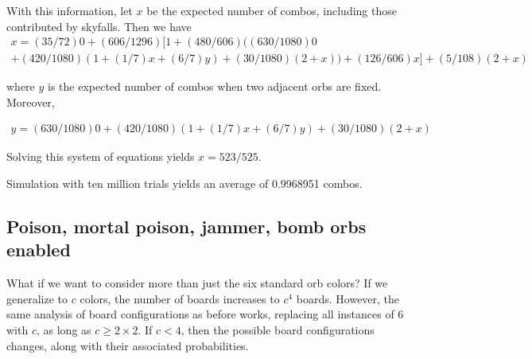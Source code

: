 \documentclass[12pt]{article}
\theoremstyle{definition}
\begin{document}
With this information, let $x$ be the expected number of combos, including those contributed by skyfalls. Then we have
\begin{multline*}
    x = (35/72)0 + (606/1296)[1+(480/606)((630/1080)0 \\
    +(420/1080)(1+(1/7)x+(6/7)y)+(30/1080)(2+x))+(126/606)x] + (5/108)(2+x)
\end{multline*}

where $y$ is the expected number of combos when two adjacent orbs are fixed. Moreover,
\begin{comment}
\begin{multline*}
    y = (630/1080)(0)+(420/1080)[1+(80/101)((1/7)x+(6/7)y)+(21/101)x] \\
    +(30/1080)(2+x)
\end{multline*}
\begin{multline*}
    y = (630/1080)(0)+(420/1080)[1+(60/420)x+(360/420)y] \\
    +(30/1080)(2+x)
\end{multline*}
\end{comment}
\begin{align*}
    y=(630/1080)0
    +(420/1080)(1+(1/7)x+(6/7)y)
    +(30/1080)(2+x)
\end{align*}

Solving this system of equations yields $x = 523/525$.

Simulation with ten million trials yields an average of 0.9968951 combos.

\subsection{Poison, mortal poison, jammer, bomb orbs enabled}
What if we want to consider more than just the six standard orb colors? If we generalize to $c$ colors, the number of boards increases to $c^4$ boards. However, the same analysis of board configurations as before works, replacing all instances of 6 with $c$, as long as $c\geq 2\times 2$. If $c<4$, then the possible board configurations changes, along with their associated probabilities.
\end{document}
